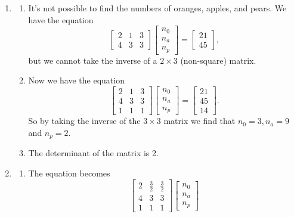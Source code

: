 \begin{sol}
\begin{enumerate}
    \item \begin{enumerate}
        \item It's not possible to find the numbers of oranges, apples, and pears. We have the equation
        $$\begin{bmatrix}
        2 & 1 & 3 \\ 4 & 3 & 3
        \end{bmatrix}\begin{bmatrix}
        n_0 \\ n_a \\ n_p
        \end{bmatrix} = \begin{bmatrix}
        21 \\ 45
        \end{bmatrix},$$
        but we cannot take the inverse of a $2 \times 3$ (non-square) matrix.
        \item Now we have the equation
        $$\begin{bmatrix}
        2 & 1 & 3 \\ 4 & 3 & 3 \\ 1 & 1 & 1
        \end{bmatrix}\begin{bmatrix}
        n_0 \\ n_a \\ n_p
        \end{bmatrix} = \begin{bmatrix}
        21 \\ 45 \\ 14
        \end{bmatrix}.$$
        So by taking the inverse of the $3 \times 3$ matrix we find that $n_0 = 3, n_a = 9$ and $n_p = 2.$
        \item The determinant of the matrix is 2.
    \end{enumerate}
    \item \begin{enumerate}
        \item The equation becomes
        $$\begin{bmatrix}
        2 & \frac32 & \frac32 \\ 4 & 3 & 3 \\ 1 & 1 & 1
        \end{bmatrix}\begin{bmatrix}
        n_0 \\ n_a \\ n_p

\end{bmatrix}$$
\end{enumerate}
\end{enumerate}
\end{sol}
